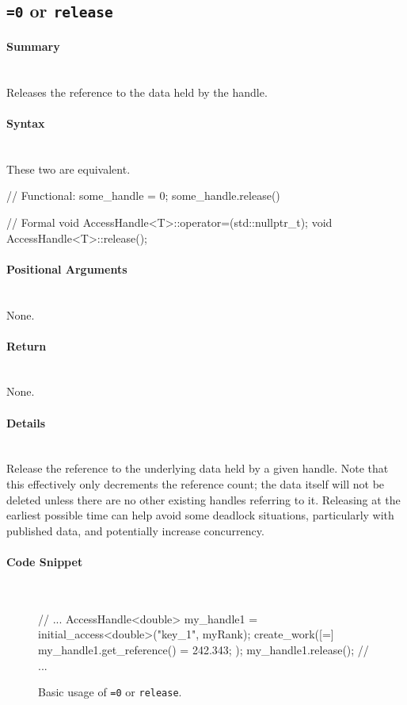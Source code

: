 \subsection{\texttt{=0} or \texttt{release}}

\paragraph{Summary} \mbox{}\\
Releases the reference to the data held by the handle.

\paragraph{Syntax} \mbox{}\\
These two are equivalent.
\begin{CppCode}
// Functional:
some_handle = 0;    
some_handle.release()

// Formal
void AccessHandle<T>::operator=(std::nullptr_t);
void AccessHandle<T>::release();
\end{CppCode}


\paragraph{Positional Arguments} \mbox{}\\
None.

\paragraph{Return} \mbox{}\\
None.

\paragraph{Details} \mbox{}\\
Release the reference to the underlying data held by a given handle.  Note that
this effectively only decrements the reference count; the data itself will not
be deleted unless there are no other existing handles referring to it.  Releasing
at the earliest possible time can help avoid some deadlock situations,
particularly with published data, and potentially increase concurrency.

\paragraph{Code Snippet} \mbox{}\\
\begin{figure}[!h]
\begin{CppCodeNumb}
// ...
AccessHandle<double> my_handle1 = initial_access<double>("key_1", myRank);
create_work([=]{
	my_handle1.get_reference() = 242.343;
});
my_handle1.release();
// ...
\end{CppCodeNumb}
\label{fig:fe_api_release}
\caption{Basic usage of \lstinline|=0| or \lstinline|release|.}
\end{figure}



